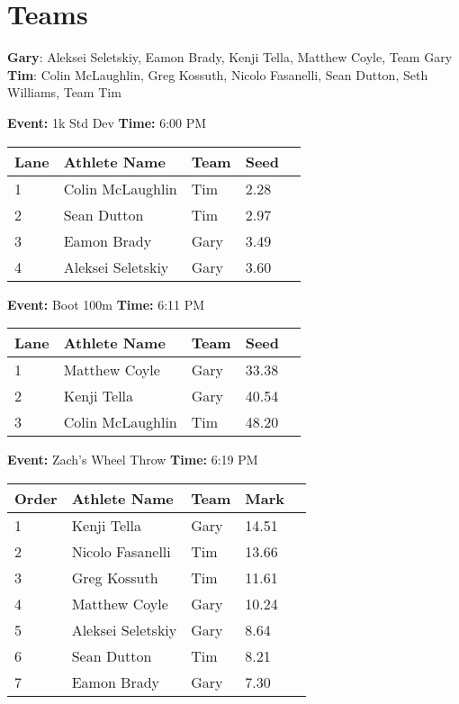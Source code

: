 \documentclass[10pt]{article}
\begin{document}
\vspace{2em}
\section*{Teams}

\textbf{Gary}: Aleksei Seletskiy, Eamon Brady, Kenji Tella, Matthew Coyle, Team Gary
\\\textbf{Tim}: Colin McLaughlin, Greg Kossuth, Nicolo Fasanelli, Sean Dutton, Seth Williams, Team Tim

\twocolumn


\textbf{Event:} 1k Std Dev \quad \textbf{Time:} 6:00 PM 

\vspace{1em}
\begin{tabular}{@{}lllll@{}}
\toprule

\textbf{Lane} & \textbf{Athlete Name} & \textbf{Team} & \textbf{Seed} \\
\midrule
1 & Colin McLaughlin & Tim & 2.28 &\\
2 & Sean Dutton & Tim & 2.97 &\\
3 & Eamon Brady & Gary & 3.49 &\\
4 & Aleksei Seletskiy & Gary & 3.60 &\\
\bottomrule
\end{tabular}
\vspace{2.5em}


\textbf{Event:} Boot 100m \quad \textbf{Time:} 6:11 PM 

\vspace{1em}
\begin{tabular}{@{}lllll@{}}
\toprule

\textbf{Lane} & \textbf{Athlete Name} & \textbf{Team} & \textbf{Seed} \\
\midrule
1 & Matthew Coyle & Gary & 33.38 &\\
2 & Kenji Tella & Gary & 40.54 &\\
3 & Colin McLaughlin & Tim & 48.20 &\\
\bottomrule
\end{tabular}
\vspace{2.5em}


\textbf{Event:} Zach's Wheel Throw \quad \textbf{Time:} 6:19 PM 

\vspace{1em}
\begin{tabular}{@{}lllll@{}}
\toprule

\textbf{Order} & \textbf{Athlete Name} & \textbf{Team} & \textbf{Mark} \\
\midrule
1 & Kenji Tella & Gary & 14.51 &\\
2 & Nicolo Fasanelli & Tim & 13.66 &\\
3 & Greg Kossuth & Tim & 11.61 &\\
4 & Matthew Coyle & Gary & 10.24 &\\
5 & Aleksei Seletskiy & Gary & 8.64 &\\
6 & Sean Dutton & Tim & 8.21 &\\
7 & Eamon Brady & Gary & 7.30 &\\
\bottomrule
\end{tabular}
\vspace{2.5em}
\end{document}
